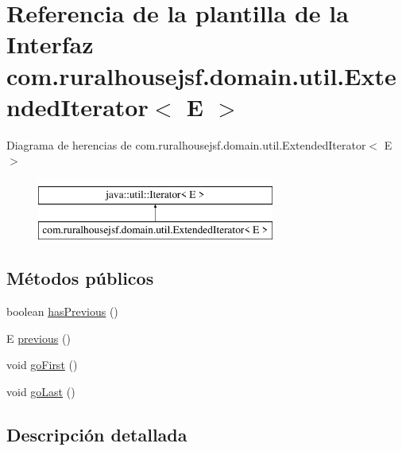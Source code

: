 \hypertarget{interfacecom_1_1ruralhousejsf_1_1domain_1_1util_1_1_extended_iterator}{}\section{Referencia de la plantilla de la Interfaz com.\+ruralhousejsf.\+domain.\+util.\+Extended\+Iterator$<$ E $>$}
\label{interfacecom_1_1ruralhousejsf_1_1domain_1_1util_1_1_extended_iterator}
Diagrama de herencias de com.\+ruralhousejsf.\+domain.\+util.\+Extended\+Iterator$<$ E $>$\begin{figure}[H]
\begin{center}
\leavevmode
\includegraphics[height=2.000000cm]{d5/ded/interfacecom_1_1ruralhousejsf_1_1domain_1_1util_1_1_extended_iterator}
\end{center}
\end{figure}
\subsection*{Métodos públicos}
\begin{DoxyCompactItemize}
\item 
boolean \mbox{\hyperlink{interfacecom_1_1ruralhousejsf_1_1domain_1_1util_1_1_extended_iterator_a8aa41cc3f69db973663cf92a484579a9}{has\+Previous}} ()
\item 
E \mbox{\hyperlink{interfacecom_1_1ruralhousejsf_1_1domain_1_1util_1_1_extended_iterator_a4c9f9f5da6e96c08bc44d55517689397}{previous}} ()
\item 
void \mbox{\hyperlink{interfacecom_1_1ruralhousejsf_1_1domain_1_1util_1_1_extended_iterator_a1a2554fbed6834a638e31a23b739a684}{go\+First}} ()
\item 
void \mbox{\hyperlink{interfacecom_1_1ruralhousejsf_1_1domain_1_1util_1_1_extended_iterator_a055883d2a28df4ac0da7476a2a773f36}{go\+Last}} ()
\end{DoxyCompactItemize}


\subsection{Descripción detallada}


